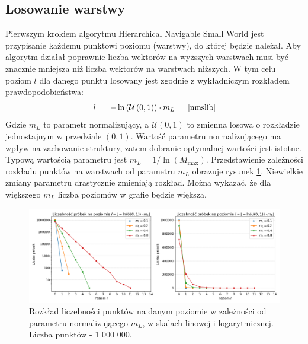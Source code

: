 \documentclass[twocolumn]{article}
\begin{document}
\subsection{Losowanie warstwy}
Pierwszym krokiem algorytmu Hierarchical Navigable Small World jest przypisanie każdemu punktowi poziomu (warstwy), do której będzie należał. Aby algorytm działał poprawnie liczba wektorów na wyższych warstwach musi być znacznie mniejsza niż liczba wektorów na warstwach niższych. W tym celu poziom $l$ dla danego punktu losowany jest zgodnie z wykładniczym rozkładem prawdopodobieństwa:
\begin{equation}\label{eq:l}
    l = \left\lfloor-\ln\left(\mathcal{U}\left(0,1\right)\right)\cdot m_L\right\rfloor \quad \cite{nmslib}
\end{equation}
Gdzie $m_{L}$ to parametr normalizujący, a $\mathcal{U}\left(0,1\right)$ to zmienna losowa o rozkładzie jednostajnym w przedziale $\left(0,1\right)$. Wartość parametru normalizującego ma wpływ na zachowanie struktury, zatem dobranie optymalnej wartości jest istotne. Typową wartością parametru jest $m_{L} = 1/\ln(M_{\max})$. \cite{Malkov2016}
\newline\newline
Przedstawienie zależności rozkładu punktów na warstwach od parametru $m_L$ obrazuje rysunek \ref{fig:1}. Niewielkie zmiany parametru drastycznie zmieniają rozkład. Można wykazać, że dla większego $m_L$ liczba poziomów w grafie będzie większa.

\begin{figure}[!t]
    \centering
    \includegraphics[width=1\linewidth]{Figure_1.png}
    \caption{Rozkład liczebności punktów na danym poziomie w zależności od parametru normalizującego $m_L$, w skalach linowej i logarytmicznej. Liczba punktów - 1 000 000.}
    \label{fig:1}
\end{figure}
\vfill
\break
\end{document}
